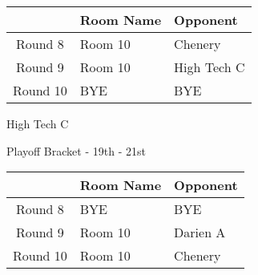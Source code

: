 \documentclass{article}%
\begin{document}
\vspace*{4pt}%
%
\begin{tabularx}{\textwidth}{|c|Y|Y|}%
\hline%
&Room Name&Opponent\\%
\hline%
Round 8&Room 10&Chenery\\%
Round 9&Room 10&High Tech C\\%
Round 10&BYE&BYE\\%
\hline%
\end{tabularx}%
\vspace*{80pt}%
\linebreak%
\newpage%
\begin{center}%
\begin{Huge}%
High Tech C%
\end{Huge}%
\vspace*{12pt}%
\linebreak%
\begin{Large}%
Playoff Bracket {-} 19th {-} 21st%
\end{Large}%
\end{center}%
\vspace*{4pt}%
%
\begin{tabularx}{\textwidth}{|c|Y|Y|}%
\hline%
&Room Name&Opponent\\%
\hline%
Round 8&BYE&BYE\\%
Round 9&Room 10&Darien A\\%
Round 10&Room 10&Chenery\\%
\hline%
\end{tabularx}%
\vspace*{80pt}%
\linebreak%
\newpage%
\end{document}
